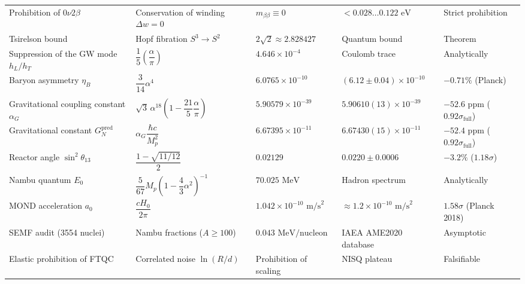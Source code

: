 \documentclass[11pt,a4paper]{article}
\theoremstyle{definition}
\theoremstyle{remark}
\begin{document}
\begin{xltabular}{\textwidth}{
>{\raggedright\arraybackslash}p{3.8cm}
>{\centering\arraybackslash}X
>{\centering\arraybackslash}p{2.7cm}
>{\centering\arraybackslash}p{2.8cm}
>{\centering\arraybackslash}p{2.0cm}
}
Prohibition of $0\nu 2\beta$ & Conservation of winding $\Delta w = 0$ & $m_{\beta\beta} \equiv 0$ & $< 0.028\dots 0.122\text{ eV}$ & Strict prohibition \\

Tsirelson bound & Hopf fibration $S^3 \to S^2$ & $2\sqrt{2} \approx 2.828427$ & Quantum bound & Theorem \\

Suppression of the GW mode $h_L/h_T$ & $\dfrac{1}{5}\left(\dfrac{\alpha}{\pi}\right)$ & $4.646 \times 10^{-4}$ & Coulomb trace & Analytically \\

Baryon asymmetry $\eta_B$ & $\dfrac{3}{14}\alpha^4$ & $6.0765 \times 10^{-10}$ & $(6.12 \pm 0.04)\times 10^{-10}$ & $-0.71\%$ (Planck) \\

 \\
\midrule

Gravitational coupling constant $\alpha_G$ & $\sqrt{3}\,\alpha^{18}\left(1 - \dfrac{21}{5}\dfrac{\alpha}{\pi}\right)$ & $5.90579 \times 10^{-39}$ & $5.90610(13)\times 10^{-39}$ & $-52.6\text{ ppm}$ ($0.92\sigma_{\mathrm{full}}$) \\

Gravitational constant $G_N^{\mathrm{pred}}$ & $\alpha_G \dfrac{\hbar c}{M_p^2}$ & $6.67395 \times 10^{-11}$ & $6.67430(15)\times 10^{-11}$ & $-52.4\text{ ppm}$ ($0.92\sigma_{\mathrm{full}}$) \\

Reactor angle $\sin^2\theta_{13}$ & $\dfrac{1 - \sqrt{11/12}}{2}$ & $0.02129$ & $0.0220 \pm 0.0006$ & $-3.2\%$ ($1.18\sigma$) \\

Nambu quantum $E_0$ & $\dfrac{5}{67} M_p \left(1 - \dfrac{4}{3}\alpha^2\right)^{-1}$ & $70.025\text{ MeV}$ & Hadron spectrum & Analytically \\

MOND acceleration $a_0$ & $\dfrac{c H_0}{2\pi}$ & $1.042 \times 10^{-10}\text{ m/s}^2$ & $\approx 1.2 \times 10^{-10}\text{ m/s}^2$ & $1.58\sigma$ (Planck 2018) \\

SEMF audit (3554 nuclei) & Nambu fractions ($A \ge 100$) & $0.043\text{ MeV/nucleon}$ & IAEA AME2020 database & Asymptotic \\

Elastic prohibition of FTQC & Correlated noise $\ln(R/d)$ & Prohibition of scaling & NISQ plateau & Falsifiable \\

\end{xltabular}
\endgroup
\end{document}
